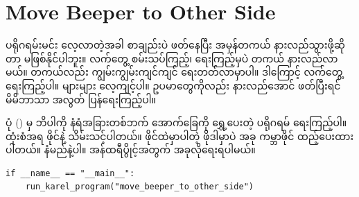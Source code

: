 \begin{figure}[tbh!]
\caption{} 
\label{fig:mtkrlprgm1}
\end{figure}

\section{Move Beeper to Other Side}
ပရိုဂရမ်းမင်း လေ့လာတဲ့အခါ စာချည်းပဲ ဖတ်နေပြီး အမှန်တကယ် နားလည်သွားဖို့ဆိုတာ မဖြစ်နိုင်ပါဘူး။ လက်တွေ့ စမ်းသပ်ကြည့်၊ ရေးကြည့်မှပဲ တကယ် နားလည်လာမယ်။ တကယ်လည်း ကျွမ်းကျွမ်းကျင်ကျင် ရေးတတ်လာမှာပါ။ ဒါကြောင့် လက်တွေ့ရေးကြည့်ပါ။ များများ လေ့ကျင့်ပါ။ ဥပမာတွေကိုလည်း နားလည်အောင် ဖတ်ပြီးရင် မိမိဘာသာ အလွတ် ပြန်ရေးကြည့်ပါ။ 

ပုံ (\fRefNo{\ref{fig:mbtos}}) မှ ဘိပါကို နံရံအခြားတစ်ဘက် အောက်ခြေကို ရွှေ့ပေးတဲ့ ပရိုဂရမ် ရေးကြည့်ပါ။  ထုံးစံအရ  ဖိုင်နဲ့ သိမ်းသင့်ပါတယ်။  ဖိုင်ထဲမှာပါတဲ့  ဖိုဒါမှာပဲ အခု ကမ္ဘာဖိုင် ထည့်ပေးထားပါတယ်။  နံမည်နဲ့ပါ။ အန်ထရီပွိုင့်အတွက် အခုလိုရေးရပါမယ်။

\setlength{\fboxsep}{0pt}
\begin{verbatim}
if __name__ == "__main__":
    run_karel_program("move_beeper_to_other_side")
\end{verbatim}

